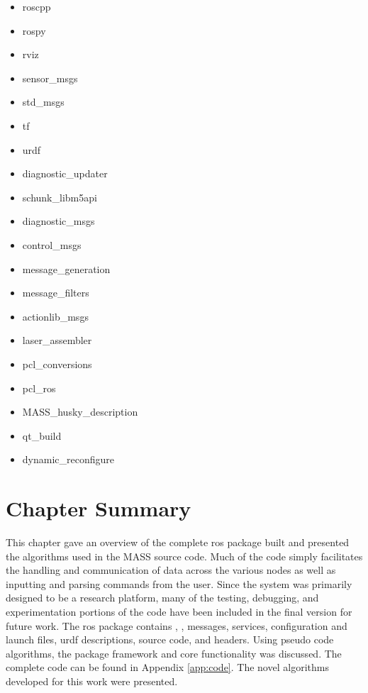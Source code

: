 \begin{itemize}
\item roscpp
\item rospy
\item rviz
\item sensor\_msgs
\item std\_msgs
\item tf
\item urdf 
\item diagnostic\_updater
\item schunk\_libm5api
\item diagnostic\_msgs
\item control\_msgs
\item message\_generation
\item message\_filters
\item actionlib\_msgs
\item laser\_assembler
\item pcl\_conversions 
\item pcl\_ros 
\item MASS\_husky\_description
\item qt\_build
\item dynamic\_reconfigure
\end{itemize}

\section{Chapter Summary}
This chapter gave an overview of the complete \acrshort{ros} package built and presented the algorithms used in the MASS source code. Much of the code simply facilitates the handling and communication of data across the various nodes as well as inputting and parsing commands from the user. Since the system was primarily designed to be a research platform, many of the testing, debugging, and experimentation portions of the code have been included in the final version for future work. The \acrshort{ros} package contains , , messages, services, configuration and launch files, \acrshort{urdf} descriptions, source code, and headers. Using pseudo code algorithms, the package framework and core functionality was discussed. The complete code can be found in Appendix \ref{app:code}. The novel algorithms developed for this work were presented.\\